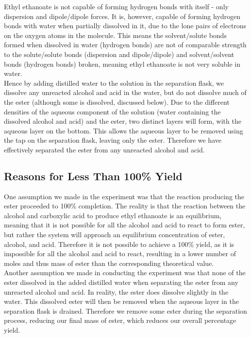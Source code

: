 \documentclass[a4paper,11pt]{article}
\begin{document}
Ethyl ethanoate is not capable of forming hydrogen bonds with itself - only
dispersion and dipole/dipole forces. It is, however, capable of forming hydrogen
bonds with
water when partially dissolved in it, due to the lone pairs of electrons on the
oxygen atoms in the molecule. This means the solvent/solute bonds
formed when dissolved in water (hydrogen bonds) are not of comparable
strength to the
solute/solute bonds (dispersion and dipole/dipole) and solvent/solvent
bonds (hydrogen bonds) broken, meaning ethyl ethanoate is not very soluble in
water. \\

Hence by adding distilled water to the solution in the separation flask, we
dissolve any unreacted alcohol and acid in the water, but do not dissolve much
of the ester (although some is dissolved, discussed below). Due to the different
densities of the aqueous component of the solution (water containing the
dissolved alcohol and acid) and the ester, two distinct
layers will form, with the aqueous layer on the bottom. This allows the aqueous
layer to be removed using the tap on the separation flask, leaving only the
ester. Therefore we have effectively separated the ester from any unreacted
alcohol and acid.


\subsection{Reasons for Less Than 100\% Yield}

One assumption we made in the experiment was that the reaction producing the
ester proceeded to 100\% completion. The reality is that the reaction between
the alcohol and carboxylic acid to produce ethyl ethanoate is an equilibrium,
meaning that it is not possible for all the alcohol and acid to react to form
ester, but rather the system will approach an equilibrium concentration of ester,
alcohol, and acid. Therefore it is not possible to achieve a 100\% yield, as it
is impossible for all the alcohol and acid to react, resulting in a lower number
of moles and thus mass of ester than the corresponding theoretical value. \\

Another assumption we made in conducting the experiment was that none of the ester
dissolved in the added distilled water when separating the ester
from any unreacted alcohol and acid. In reality, the ester does dissolve
slightly in the water. This dissolved ester will then be removed when the
aqueous layer in the separation flask is drained. Therefore we remove some ester
during the separation process, reducing our final mass of ester, which reduces
our overall percentage yield. \\
\end{document}
